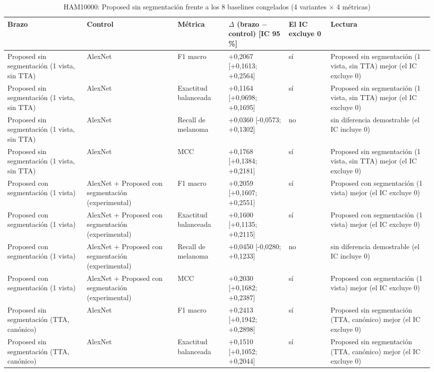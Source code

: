 
\begingroup\scriptsize
\begin{longtable}{@{}llllll@{}}
\caption{HAM10000: Proposed sin segmentación frente a los 8 baselines congelados (4 variantes × 4 métricas)}\label{tab:contrast-e3b-above} \\
\toprule
Brazo & Control & Métrica & $\Delta$ (brazo $-$ control) [IC 95 \%] & El IC excluye 0 & Lectura \\
\midrule
Proposed sin segmentación (1 vista, sin TTA) & AlexNet & F1 macro & +0,2067 [+0,1613; +0,2564] & sí & Proposed sin segmentación (1 vista, sin TTA) mejor (el IC excluye 0) \\
Proposed sin segmentación (1 vista, sin TTA) & AlexNet & Exactitud balanceada & +0,1164 [+0,0698; +0,1695] & sí & Proposed sin segmentación (1 vista, sin TTA) mejor (el IC excluye 0) \\
Proposed sin segmentación (1 vista, sin TTA) & AlexNet & Recall de melanoma & +0,0360 [-0,0573; +0,1302] & no & sin diferencia demostrable (el IC incluye 0) \\
Proposed sin segmentación (1 vista, sin TTA) & AlexNet & MCC & +0,1768 [+0,1384; +0,2181] & sí & Proposed sin segmentación (1 vista, sin TTA) mejor (el IC excluye 0) \\
Proposed con segmentación (1 vista) & AlexNet + Proposed con segmentación (experimental) & F1 macro & +0,2059 [+0,1607; +0,2551] & sí & Proposed con segmentación (1 vista) mejor (el IC excluye 0) \\
Proposed con segmentación (1 vista) & AlexNet + Proposed con segmentación (experimental) & Exactitud balanceada & +0,1600 [+0,1135; +0,2115] & sí & Proposed con segmentación (1 vista) mejor (el IC excluye 0) \\
Proposed con segmentación (1 vista) & AlexNet + Proposed con segmentación (experimental) & Recall de melanoma & +0,0450 [-0,0280; +0,1233] & no & sin diferencia demostrable (el IC incluye 0) \\
Proposed con segmentación (1 vista) & AlexNet + Proposed con segmentación (experimental) & MCC & +0,2030 [+0,1682; +0,2387] & sí & Proposed con segmentación (1 vista) mejor (el IC excluye 0) \\
Proposed sin segmentación (TTA, canónico) & AlexNet & F1 macro & +0,2413 [+0,1942; +0,2898] & sí & Proposed sin segmentación (TTA, canónico) mejor (el IC excluye 0) \\
Proposed sin segmentación (TTA, canónico) & AlexNet & Exactitud balanceada & +0,1510 [+0,1052; +0,2044] & sí & Proposed sin segmentación (TTA, canónico) mejor (el IC excluye 0) \\

\end{longtable}
